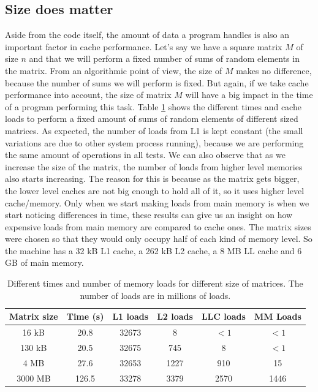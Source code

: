 \documentclass[12pt]{diicc}
\begin{document}
\subsection{Size does matter}

Aside from the code itself, the amount of data a program handles is also an important factor in cache performance. Let's say we have a square matrix $M$ of size $n$ and that we will perform a fixed number of sums of random elements in the matrix. From an algorithmic point of view, the size of $M$ makes no difference, because the number of sums we will perform is fixed. But again, if we take cache performance into account, the size of matrix $M$ will have a big impact in the time of a program performing this task. Table \ref{tab:matrix_size} shows the different times and cache loads to perform a fixed amount of sums of random elements of different sized matrices. As expected, the number of loads from L1 is kept constant (the small variations are due to other system process running), because we are performing the same amount of operations in all tests. We can also observe that as we increase the size of the matrix, the number of loads from higher level memories also starts increasing. The reason for this is because as the matrix gets bigger, the lower level caches are not big enough to hold all of it, so it uses higher level cache/memory. Only when we start making loads from main memory is when we start noticing differences in time, these results can give us an insight on how expensive loads from main memory are compared to cache ones. The matrix sizes were chosen so that they would only occupy half of each kind of memory level. So the machine has a 32 kB L1 cache, a 262 kB L2 cache, a 8 MB LL cache and 6 GB of main memory.

\begin{table}
\begin{center}
\begin{tabular}{ c | c | c | c | c | c }
  Matrix size & Time (s) & L1 loads & L2 loads & LLC loads & MM Loads \\ \hline
  16 kB 	& 20.8 	& 32673  	& 8  		& $<1$  		& $<1$ 	 \\
  130 kB 	& 20.5 	& 32675  	& 745  		& 8			& $<1$  	 \\ 
  4 MB 		& 27.6	& 32653 	& 1227 		& 910		& 15 	\\
  3000 MB 	& 126.5	& 33278		& 3379		& 2570		& 1446   
\end{tabular}
\caption{Different times and number of memory loads for different size of matrices. The number of loads are in millions of loads.\label{tab:matrix_size}}
\end{center}
\end{table}
\end{document}
